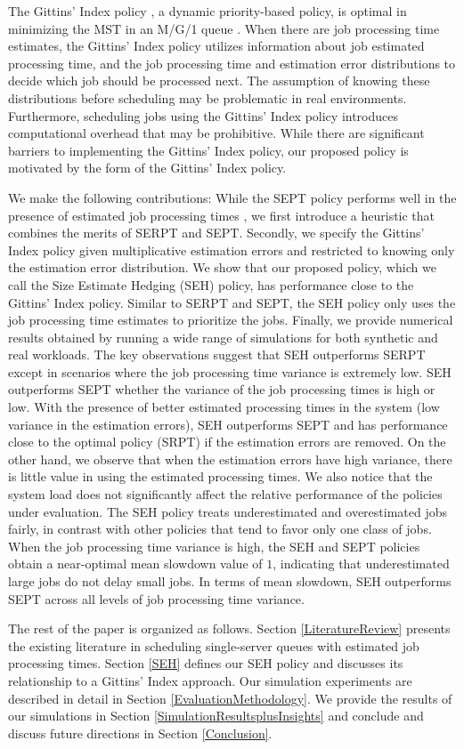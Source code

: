 The Gittins' Index policy \cite {gittins1979bandit}, a dynamic priority-based policy, is optimal in minimizing the MST in an M/G/1 queue \cite{aalto2009gittins}. When there are job processing time estimates, the Gittins' Index policy utilizes information about job estimated processing time, and the job processing time and estimation error distributions to decide which job should be processed next. The assumption of knowing these distributions before scheduling may be problematic in real environments. Furthermore, scheduling jobs using the Gittins' Index policy introduces computational overhead that may be prohibitive. While there are significant barriers to implementing the Gittins' Index policy, our proposed policy is motivated by the form of the Gittins' Index policy.

We make the following contributions: While the SEPT policy performs well in the presence of estimated job processing times \cite {dell2019scheduling}, we first introduce a heuristic that combines the merits of SERPT and SEPT.
Secondly, we specify the Gittins' Index policy given multiplicative estimation errors and restricted to knowing only the estimation error distribution. We show that our proposed policy, which we call the Size Estimate Hedging (SEH) policy, has performance close to the Gittins' Index policy. Similar to SERPT and SEPT, the SEH policy only uses the job processing time estimates to prioritize the jobs. Finally, we provide numerical results obtained by running a wide range of simulations for both synthetic and real workloads. The key observations suggest that SEH outperforms SERPT except in scenarios where the job processing time variance is extremely low. SEH outperforms SEPT whether the variance of the job processing times is high or low. With the presence of better estimated processing times in the system (low variance in the estimation errors), SEH outperforms SEPT and has performance close to the optimal policy (SRPT) if the estimation errors are removed. On the other hand, we observe that when the estimation errors have high variance, there is little value in using the estimated processing times. We also notice that the system load does not significantly affect the relative performance of the policies under evaluation. The SEH policy treats underestimated and overestimated jobs fairly, in contrast with other policies that tend to favor only one class of jobs. When the job processing time variance is high, the SEH and SEPT policies obtain a near-optimal mean slowdown value of $1$, indicating that underestimated large jobs do not delay small jobs. In terms of mean slowdown, SEH outperforms SEPT across all levels of job processing time variance.

The rest of the paper is organized as follows. Section \ref{LiteratureReview} presents the existing literature in scheduling single-server queues with estimated job processing times. Section \ref{SEH} defines our SEH policy and discusses its relationship to a Gittins' Index approach. Our simulation experiments are described in detail in Section \ref {EvaluationMethodology}.
We provide the results of our simulations in Section \ref{SimulationResultsplusInsights} and conclude and discuss future directions in Section \ref{Conclusion}.